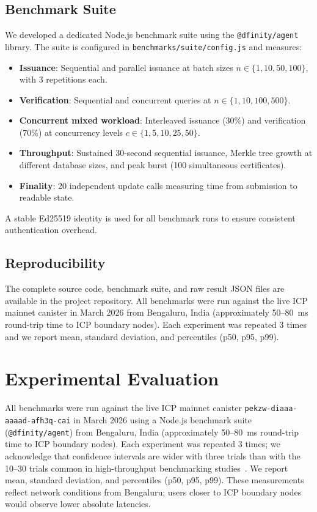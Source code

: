 \documentclass[journal]{IEEEtran}
\begin{document}
\subsection{Benchmark Suite}

We developed a dedicated Node.js benchmark suite using the \texttt{@dfinity/agent} library. The suite is configured in \texttt{benchmarks/suite/config.js} and measures:

\begin{itemize}[leftmargin=*]
  \item \textbf{Issuance}: Sequential and parallel issuance at batch sizes $n \in \{1, 10, 50, 100\}$, with 3 repetitions each.
  \item \textbf{Verification}: Sequential and concurrent queries at $n \in \{1, 10, 100, 500\}$.
  \item \textbf{Concurrent mixed workload}: Interleaved issuance (30\%) and verification (70\%) at concurrency levels $c \in \{1, 5, 10, 25, 50\}$.
  \item \textbf{Throughput}: Sustained 30-second sequential issuance, Merkle tree growth at different database sizes, and peak burst (100 simultaneous certificates).
  \item \textbf{Finality}: 20 independent update calls measuring time from submission to readable state.
\end{itemize}

A stable Ed25519 identity is used for all benchmark runs to ensure consistent authentication overhead.

\subsection{Reproducibility}

The complete source code, benchmark suite, and raw result JSON files are available in the project repository. All benchmarks were run against the live ICP mainnet canister in March 2026 from Bengaluru, India (approximately 50--80~ms round-trip time to ICP boundary nodes). Each experiment was repeated 3 times and we report mean, standard deviation, and percentiles (p50, p95, p99).

\section{Experimental Evaluation}
\label{sec:eval}

All benchmarks were run against the live ICP mainnet canister \texttt{pekzw-diaaa-aaaad-afh3q-cai} in March 2026 using a Node.js benchmark suite (\texttt{@dfinity/agent}) from Bengaluru, India (approximately 50--80~ms round-trip time to ICP boundary nodes). Each experiment was repeated 3 times; we acknowledge that confidence intervals are wider with three trials than with the 10--30 trials common in high-throughput benchmarking studies~\cite{dinh2017blockbench}. We report mean, standard deviation, and percentiles (p50, p95, p99). These measurements reflect network conditions from Bengaluru; users closer to ICP boundary nodes would observe lower absolute latencies.
\end{document}

